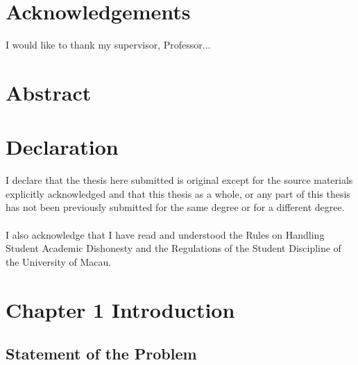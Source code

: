 \documentclass[a4paper, 12pt, twoside]{article}
\begin{document}
\restoregeometry
\setcounter{page}{1}
\section*{\centering \bf \normalsize{Acknowledgements}}

I would like to thank my supervisor, Professor... \\
\lipsum[1]
\newpage

\section*{\centering \bf \normalsize{Abstract}}
\lipsum[2]
\newpage

\section*{\centering \bf \normalsize{Declaration}}
I declare that the thesis here submitted is original except for the source materials explicitly acknowledged  and that this thesis as a whole, or any part of this thesis has not been previously submitted for the same degree or for a different degree.\\ \\ 
I also acknowledge that I have read and understood the Rules on Handling Student Academic Dishonesty and the Regulations of the Student Discipline of the University of Macau.

\newpage
\renewcommand\contentsname{Table of Contents}
\tableofcontents
\newpage
\listoffigures 
\newpage
\listoftables

\newpage 
\setcounter{page}{1}
\section*{\centering \bf \normalsize{Chapter 1 Introduction}}
\label{sec:intro}
\lipsum[2]
\setcounter{section}{1}
\subsection{\bf \normalsize{Statement of the Problem}}
\lipsum[1]
\end{document}
